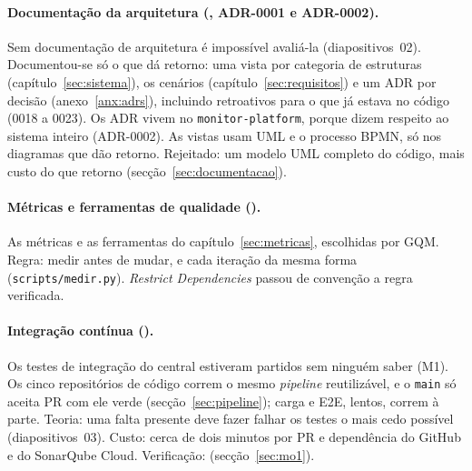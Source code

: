 \paragraph{Documentação da arquitetura (, ADR-0001 e ADR-0002).}
Sem documentação de arquitetura é impossível avaliá-la (diapositivos~02). Documentou-se só o que dá retorno: uma
vista por categoria de estruturas (capítulo~\ref{sec:sistema}), os cenários (capítulo~\ref{sec:requisitos}) e um
ADR por decisão (anexo~\ref{anx:adrs}), incluindo retroativos para o que já estava no código (0018 a 0023). Os ADR
vivem no \texttt{monitor-platform}, porque dizem respeito ao sistema inteiro (ADR-0002). As vistas usam UML e
o processo BPMN, só nos diagramas que dão retorno. Rejeitado: um modelo UML completo do código, mais custo do que
retorno (secção~\ref{sec:documentacao}).

\paragraph{Métricas e ferramentas de qualidade ().}
As métricas e as ferramentas do capítulo~\ref{sec:metricas}, escolhidas por GQM. Regra: medir antes de mudar, e
cada iteração da mesma forma (\texttt{scripts/medir.py}). \emph{Restrict Dependencies} passou de convenção a regra
verificada.

\paragraph{Integração contínua ().}
Os testes de integração do central estiveram partidos sem ninguém saber (M1). Os cinco repositórios de código
correm o mesmo \emph{pipeline} reutilizável, e o \texttt{main} só aceita PR com ele verde
(secção~\ref{sec:pipeline}); carga e E2E, lentos, correm à parte. Teoria: uma falta presente deve fazer falhar os
testes o mais cedo possível (diapositivos~03). Custo: cerca de dois minutos por PR e dependência do GitHub e do
SonarQube Cloud. Verificação:  (secção~\ref{sec:mo1}).
